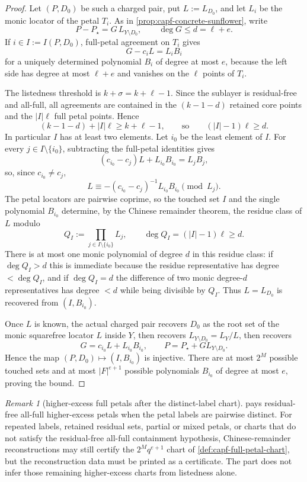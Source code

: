 \documentclass[11pt]{article}
\theoremstyle{definition}
\theoremstyle{remark}
\newtheorem{remark}[remark]{Remark}
\begin{document}
\begin{proof}
Let $(P,D_0)$ be such a charged pair, put $L:=L_{D_0}$, and let $L_i$ be the monic locator of the petal $T_i$.  As in \cref{prop:capf-concrete-sunflower}, write
\[
        P-P_\star=G\,L_{Y\setminus D_0},
        \qquad \deg G\le d=\ell+e .
\]
If $i\in I:=I(P,D_0)$, full-petal agreement on $T_i$ gives
\[
        G-c_iL=L_iB_i
\]
for a uniquely determined polynomial $B_i$ of degree at most $e$, because the left side has degree at most $\ell+e$ and vanishes on the $\ell$ points of $T_i$.

The listedness threshold is $k+\sigma=k+\ell-1$.  Since the sublayer is residual-free and all-full, all agreements are contained in the $(k-1-d)$ retained core points and the $|I|\ell$ full petal points.  Hence
\[
        (k-1-d)+|I|\ell\ge k+\ell-1,
        \qquad\text{so}\qquad
        (|I|-1)\ell\ge d .
\]
In particular $I$ has at least two elements.  Let $i_0$ be the least element of $I$.  For every $j\in I\setminus\{i_0\}$, subtracting the full-petal identities gives
\[
        (c_{i_0}-c_j)L+L_{i_0}B_{i_0}=L_jB_j,
\]
so, since $c_{i_0}\ne c_j$,
\[
        L\equiv -(c_{i_0}-c_j)^{-1}L_{i_0}B_{i_0}\pmod {L_j}.
\]
The petal locators are pairwise coprime, so the touched set $I$ and the single polynomial $B_{i_0}$ determine, by the Chinese remainder theorem, the residue class of $L$ modulo
\[
        Q_I:=\prod_{j\in I\setminus\{i_0\}}L_j,
        \qquad \deg Q_I=(|I|-1)\ell\ge d .
\]
There is at most one monic polynomial of degree $d$ in this residue class: if $\deg Q_I>d$ this is immediate because the residue representative has degree $<\deg Q_I$, and if $\deg Q_I=d$ the difference of two monic degree-$d$ representatives has degree $<d$ while being divisible by $Q_I$.  Thus $L=L_{D_0}$ is recovered from $(I,B_{i_0})$.

Once $L$ is known, the actual charged pair recovers $D_0$ as the root set of the monic squarefree locator $L$ inside $Y$, then recovers $L_{Y\setminus D_0}=L_Y/L$, then recovers
\[
        G=c_{i_0}L+L_{i_0}B_{i_0},
        \qquad
        P=P_\star+G L_{Y\setminus D_0}.
\]
Hence the map $(P,D_0)\mapsto (I,B_{i_0})$ is injective.  There are at most $2^M$ possible touched sets and at most $|F|^{e+1}$ possible polynomials $B_{i_0}$ of degree at most $e$, proving the bound.
\end{proof}

\begin{remark}[higher-excess full petals after the distinct-label chart]\label{rem:capf-higher-excess-cert}
 pays residual-free all-full higher-excess petals when the petal labels are pairwise distinct.  For repeated labels, retained residual sets, partial or mixed petals, or charts that do not satisfy the residual-free all-full containment hypothesis, Chinese-remainder reconstructions may still certify the $2^Mq^{e+1}$ chart of \cref{def:capf-full-petal-chart}, but the reconstruction data must be printed as a certificate.  The part does not infer those remaining higher-excess charts from listedness alone.
\end{remark}
\end{document}
